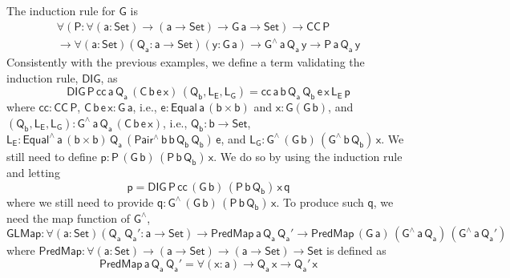 \documentclass[acmsmall,screen,review,anonymous]{acmart}
\theoremstyle{definition}
\begin{document}
The induction rule for $\mathsf{G}$ is
\begin{multline*}
\mathsf{\forall (P : \forall (a : Set) \to (a \to Set) \to G\,a \to Set) \to CC\,P} \\
\mathsf{\to \forall (a : Set)(Q_a : a \to Set)(y : G\,a) \to G^{\wedge}\,a\,Q_a\,y \to P\,a\,Q_a\,y}
\end{multline*}
Consistently with the previous examples,
we define a term validating the induction rule, $\mathsf{DIG}$, as
\[
\mathsf{DIG\,P\,cc\,a\,Q_a\,(C\,b\,e\,x)\,(Q_b, L_E, L_G)
= cc\,a\,b\,Q_a\,Q_b\,e\,x\,L_E\,p}
\]
where $\mathsf{cc : CC\,P}$,
$\mathsf{C\,b\,e\,x : G\,a}$,
i.e., $\mathsf{e : Equal\,a\,(b \times b)}$ and $\mathsf{x : G(G\,b)}$,
and $\mathsf{(Q_b, L_E, L_G) : G^{\wedge}\,a\,Q_a\,(C\,b\,e\,x)}$,
i.e., $\mathsf{Q_b : b \to Set}$, $\mathsf{L_E : Equal^{\wedge}\,a\,(b \times b)\,Q_a\,(Pair^{\wedge}\,b\,b\,Q_b\,Q_b)\,e}$,
and $\mathsf{L_G : G^{\wedge}\,(G\,b)\,(G^{\wedge}\,b\,Q_b)\,x}$.
We still need to define $\mathsf{p : P\,(G\,b)\,(P\,b\,Q_b)\,x}$.
We do so by using the induction rule and letting
\[
\mathsf{p = DIG\,P\,cc\,(G\,b)\,(P\,b\,Q_b)\,x\,q}
\]
where we still need to provide $\mathsf{q : G^{\wedge}\,(G\,b)\,(P\,b\,Q_b)\,x}$.
To produce such $\mathsf{q}$, we need the map function of $\mathsf{G^{\wedge}}$,
\[
\mathsf{GLMap : \forall (a : Set) (Q_a\;Q_a' : a \to Set) \to PredMap\,a\,Q_a\,Q_a' \to PredMap\,(G\,a)\,(G^{\wedge}\,a\,Q_a)\,(G^{\wedge}\,a\,Q_a')}
\]
where $\mathsf{PredMap : \forall (a : Set) \to (a \to Set) \to (a \to Set) \to Set}$
is defined as
\[
\mathsf{PredMap\,a\,Q_a\,Q_a' = \forall (x : a) \to Q_a\,x \to Q_a'\,x}
\]
\end{document}
